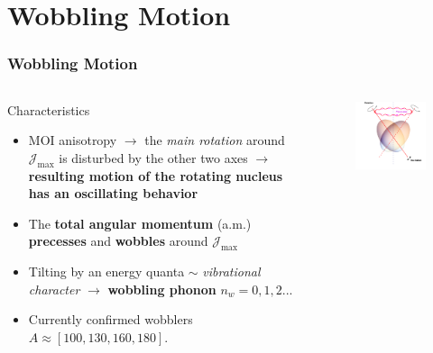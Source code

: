 \documentclass[
	11pt, %
]{beamer}
\begin{document}
\section{Wobbling Motion}

\begin{frame}
	\frametitle{Wobbling Motion}
		\begin{columns}
			\begin{column}{0.6\textwidth}
				\begin{block}{Characteristics}
					\begin{itemize}
						\item MOI anisotropy $\rightarrow$ the \emph{main rotation} around $\mathcal{J}_\text{max}$ is disturbed by the other two axes  $\rightarrow$ \textbf{resulting motion of the rotating nucleus has an oscillating behavior}
						\item The \textbf{total angular momentum } (a.m.) \textbf{precesses} and \textbf{wobbles} around $\mathcal{J}_\text{max}$
						\item Tilting by an energy quanta $\sim$ \emph{vibrational character} $\rightarrow$ \textbf{wobbling phonon} $n_w=0,1,2...$
						\item Currently confirmed wobblers $A\approx[100,130,160,180]$.
					\end{itemize}
				\end{block}
			\end{column}
			\begin{column}{0.4\textwidth}
				\begin{figure}
					\includegraphics[width=\textwidth]{figures/wobbling-schematic.png}

\end{figure}
\end{column}
\end{columns}
\end{frame}
\end{document}
